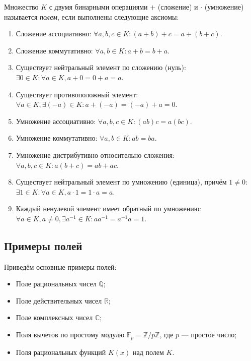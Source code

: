 \documentclass[a4paper,12pt]{article}
\theoremstyle{definition}
\theoremstyle{plain}
\theoremstyle{remark}
\begin{document}
	\begin{tcolorbox}[colback=blue!5, colframe=blue!40!black, title=Определение поля]
		Множество \( K \) с двумя бинарными операциями \( + \) (сложение) и \( \cdot \) (умножение) называется \textit{полем}, если выполнены следующие аксиомы:
		\begin{enumerate}
			\item Сложение ассоциативно: \( \forall a,b,c \in K: (a+b)+c = a+(b+c) \).
			\item Сложение коммутативно: \( \forall a,b \in K: a+b = b+a \).
			\item Существует нейтральный элемент по сложению (нуль): \( \exists 0 \in K: \forall a \in K, a+0 = 0+a = a \).
			\item Существует противоположный элемент: \( \forall a \in K, \exists (-a) \in K: a+(-a) = (-a)+a = 0 \).
			\item Умножение ассоциативно: \( \forall a,b,c \in K: (ab)c = a(bc) \).
			\item Умножение коммутативно: \( \forall a,b \in K: ab = ba \).
			\item Умножение дистрибутивно относительно сложения: \( \forall a,b,c \in K: a(b+c) = ab+ac \).
			\item Существует нейтральный элемент по умножению (единица), причём \( 1 \neq 0 \): \( \exists 1 \in K: \forall a \in K, a \cdot 1 = 1 \cdot a = a \).
			\item Каждый ненулевой элемент имеет обратный по умножению: \( \forall a \in K, a \neq 0, \exists a^{-1} \in K: a a^{-1} = a^{-1} a = 1 \).
		\end{enumerate}
	\end{tcolorbox}
	
	\subsection{Примеры полей}
	
	Приведём основные примеры полей:
	
	\begin{itemize}
		\item Поле рациональных чисел \( \mathbb{Q} \);
		\item Поле действительных чисел \( \mathbb{R} \);
		\item Поле комплексных чисел \( \mathbb{C} \);
		\item Поля вычетов по простому модулю \( \mathbb{F}_p = \mathbb{Z}/p\mathbb{Z} \), где \( p \) — простое число;
		\item Поля рациональных функций \( K(x) \) над полем \( K \).
	\end{itemize}
	
\end{document}
